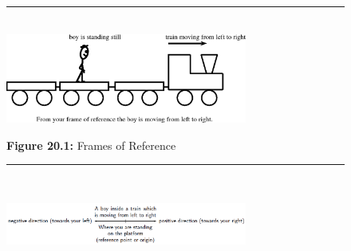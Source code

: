 	\begin{figure}[H] %
    \begin{center}
    \rule[.1in]{\figurerulewidth}{.005in} \\
        \label{m38787*uid5!!!underscore!!!media}\label{m38787*uid5!!!underscore!!!printimage}\includegraphics[width=300px]{col11305.imgs/m38787_PG10C2_001.png} %
        
      \vspace{2pt}
    \vspace{\rubberspace}\par \begin{cnxcaption}
	  \small \textbf{Figure 20.1: }Frames of Reference
	\end{cnxcaption}
      
    \vspace{.1in}
    \rule[.1in]{\figurerulewidth}{.005in} \\
        
    \end{center}

 \end{figure}   

    \addtocounter{footnote}{-0}
    
        \label{m38787*id62702}
          
    \setcounter{subfigure}{0}


	\begin{figure}[H] %
    \begin{center}
    \label{m38787*id62705!!!underscore!!!media}\label{m38787*id62705!!!underscore!!!printimage}\includegraphics[width=300px]{col11305.imgs/m38787_PG10C2_002.png} %
        
      \vspace{2pt}
    \vspace{.1in}
    
    \end{center}

 \end{figure}   


